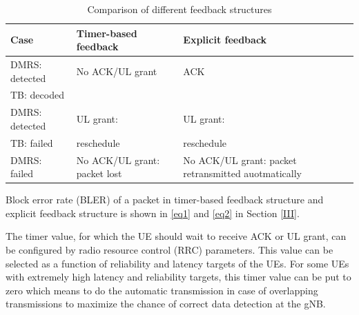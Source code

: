 \documentclass[conference]{IEEEtran}
\begin{document}
\begin{table}[htbp]
\caption{Comparison of different feedback structures}
\begin{center}
\begin{tabular}{|p{8em}|p{7em}|p{7em}|}
 \hline
 \textbf{Case} & \textbf{Timer-based feedback}&\textbf{Explicit feedback}\\
 \hline
 DMRS: detected&No ACK/UL grant&ACK\\TB: decoded & &\\
 \hline
  DMRS: detected&UL grant: &UL grant:\\TB: failed & reschedule&reschedule\\
 \hline
DMRS: failed&No ACK/UL grant: packet lost&No ACK/UL grant: packet retransmitted auotmatically\\

 
 \hline
\end{tabular}
\label{tab3}
\end{center}
\vspace{-4mm}
\end{table}


Block error rate (BLER) of a packet in timer-based feedback structure and explicit feedback structure is shown in \eqref{eq1} and \eqref{eq2} in Section \ref{III}.

The timer value, for which the UE should wait to receive ACK or UL grant, can be configured by radio resource control (RRC) parameters. This value can be selected as a function of reliability and latency targets of the UEs. For some UEs with extremely high latency and reliability targets, this timer value can be put to zero which means to do the automatic transmission in case of overlapping transmissions to maximize the chance of correct data detection at the gNB.
\end{document}
